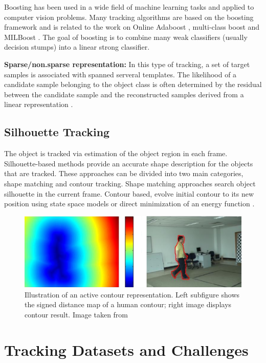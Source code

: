 Boosting has been used in a wide field of machine learning tasks and
applied to computer vision problems. Many tracking algorithms are based on the
boosting framework \cite{Freund1997a} and is related to the work on
Online Adaboost \cite{Avidan2007,Grabner2008,Oza2000}, multi-class boost
\cite{Saffari2010} and MILBoost \cite{Babenko2010}. The goal of boosting is
to combine many weak classifiers (usually decision stumps) into a linear
strong classifier.

\textbf{Sparse/non.sparse representation: } In this type of tracking, a set of
target samples is associated with spanned serveral templates. The likelihood
of a candidate sample belonging to the object class is often determined by the
residual between the candidate sample and the reconstructed samples derived from
a linear representation \cite{Zhang2012b,Zhang2012a,Bao2012,Mei2011a,Mei2011}.

\subsection{Silhouette Tracking}

The object is tracked via estimation of the object region in each frame.
Silhouette-based methods provide an accurate shape description for the
objects that are tracked. These approaches can be divided into two main
categories, shape matching and contour tracking. Shape matching \cite{Li2001}
approaches search object silhouette in the current frame. Contour based, evolve
initial contour to its new position using state space models or direct
minimization of an energy function \cite{Cremers2003}.

\begin{figure}[h!]
	\centering
		\includegraphics[width=0.9\linewidth]{Figures/contour.png}
	\caption[Illustration of an active contour representation]
			{Illustration of an active contour representation. Left subfigure
			shows the signed distance map of a human contour; right
			image displays contour result. Image taken from \cite{Yilmaz2006}}
	\label{fig::contour}
\end{figure}	
\section{Tracking Datasets and Challenges}
\label{sec::datasets}

